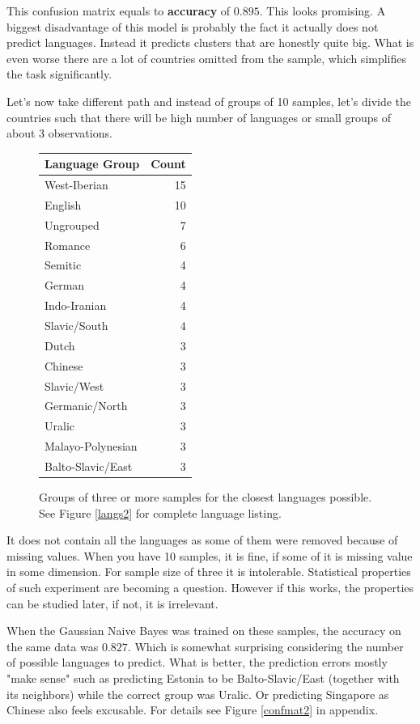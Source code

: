 \documentclass[a4paper,10pt]{article}
\begin{document}
This confusion matrix equals to \textbf{accuracy} of $0.895$.
This looks promising.
A biggest disadvantage of this model is probably the fact it actually does not predict languages.
Instead it predicts clusters that are honestly quite big.
What is even worse there are a lot of countries omitted from the sample, which simplifies the task significantly.

Let's now take different path and instead of groups of 10 samples, let's divide the countries such that there will be high number of languages or small groups of about 3 observations.


\begin{figure}[H]
\begin{longtable}[]{@{}lr@{}}
\toprule
Language Group & Count \\
\midrule
\endhead
West-Iberian       & 15 \\
English            & 10 \\
Ungrouped          &  7 \\
Romance            &  6 \\
Semitic            &  4 \\
German             &  4 \\
Indo-Iranian       &  4 \\
Slavic/South       &  4 \\
Dutch              &  3 \\
Chinese            &  3 \\
Slavic/West        &  3 \\
Germanic/North     &  3 \\
Uralic             &  3 \\
Malayo-Polynesian  &  3 \\
Balto-Slavic/East  &  3 \\
\bottomrule
\end{longtable}
\caption{Groups of three or more samples for the closest languages possible. See Figure \ref{langs2} for complete language listing.}
\end{figure}

It does not contain all the languages as some of them were removed because of missing values.
When you have 10 samples, it is fine, if some of it is missing value in some dimension.
For sample size of three it is intolerable.
Statistical properties of such experiment are becoming a question.
However if this works, the properties can be studied later, if not, it is irrelevant.


When the Gaussian Naive Bayes was trained on these samples, the accuracy on the same data was $0.827$.
Which is somewhat surprising considering the number of possible languages to predict.
What is better, the prediction errors mostly "make sense" such as predicting Estonia to be Balto-Slavic/East (together with its neighbors) while the correct group was Uralic. Or predicting Singapore as Chinese also feels excusable. For details see Figure \ref{confmat2} in appendix. 
\end{document}
